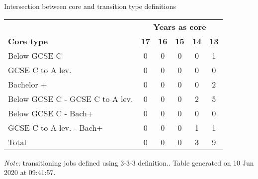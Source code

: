 \begin{center}
\begin{threeparttable}[!h]
\caption{Intersection between core and transition type definitions}
\begin{tabular}{lccccc}
\toprule
\toprule
& \multicolumn{5}{c}{\textbf{Years as core}} \\
\cline{2-6}
\textbf{Core type}&\multicolumn{1}{c}{\textbf{17}}&\multicolumn{1}{c}{\textbf{16}}&\multicolumn{1}{c}{\textbf{15}}&\multicolumn{1}{c}{\textbf{14}}&\multicolumn{1}{c}{\textbf{13}} \\
\midrule
\midrule
Below GCSE C&0&0&0&0&1 \\
GCSE C to A lev.&0&0&0&0&0 \\
Bachelor +&0&0&0&0&2 \\
Below GCSE C - GCSE C to A lev.&0&0&0&2&5 \\
Below GCSE C - Bach+&0&0&0&0&0 \\
GCSE C to A lev. - Bach+&0&0&0&1&1 \\
Total&0&0&0&3&9 \\
\bottomrule
\bottomrule
\end{tabular}
\begin{tablenotes}
\item \footnotesize \textit{Note:} transitioning jobs defined using 3-3-3 definition.. Table generated on 10 Jun 2020 at 09:41:57.
\end{tablenotes}
\end{threeparttable}
\end{center}
